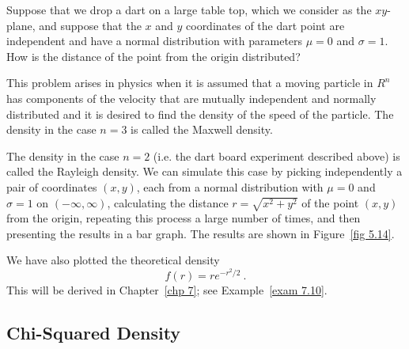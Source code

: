 \begin{example}\label{exam 5.19} Suppose that we drop a dart on a large
table top, which we consider as the
$x$$y$-plane, and suppose that the $x$ and $y$ coordinates of the dart point are
independent and have a normal distribution with parameters $\mu = 0$ and
$\sigma = 1$.  How is the distance of the point from the origin distributed?
\par
This problem arises in physics when it is assumed that a moving particle in $R^n$ has
components of the velocity that are mutually independent and normally distributed and 
it is desired to find the density of the speed of the particle.  The density in the case $n = 3$ is called
the Maxwell density.
\par
The density in the case $n = 2$ (i.e. the dart board experiment described above) is called the Rayleigh
density.  We can simulate this case by picking independently a pair of coordinates $(x,y)$, each from a
normal distribution with
$\mu = 0$ and
$\sigma = 1$ on
$(-\infty,\infty)$, calculating the distance $r = \sqrt{x^2 + y^2}$ of the point
$(x,y)$ from the origin, repeating this process a large number of times, and then
presenting the results in a bar graph.  The results are shown in Figure~\ref{fig 5.14}.


We have also plotted the theoretical density
$$ f(r) = re^{-r^2/2}\ .
$$
This will be derived in Chapter~\ref{chp 7}; see Example~\ref{exam 7.10}.
\end{example}

\subsection*{Chi-Squared Density}

